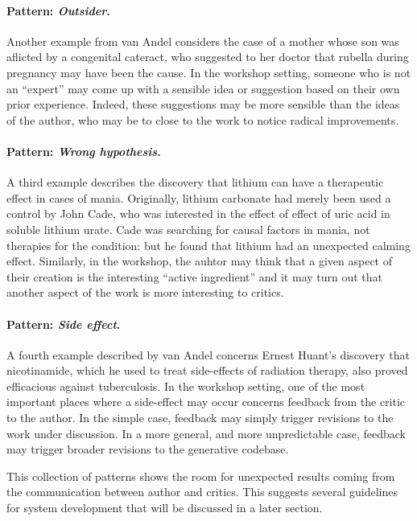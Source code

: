 \vspace{-3ex}
\paragraph{Pattern: \emph{Outsider}.}  Another example from van Andel considers
the case of a mother whose son was aflicted by a congenital cateract,
who suggested to her doctor that rubella during pregnancy may have
been the cause.  In the workshop setting, someone who is not an
``expert'' may come up with a sensible idea or suggestion based on
their own prior experience.  Indeed, these suggestions may be more
sensible than the ideas of the author, who may be to close to the work
to notice radical improvements.  

\vspace{-3ex}
\paragraph{Pattern: \emph{Wrong hypothesis}.}  A third example describes the discovery that lithium
can have a therapeutic effect in cases of mania.  Originally, lithium
carbonate had merely been used a control by John Cade, who was
interested in the effect of effect of uric acid in soluble lithium
urate.  Cade was searching for causal factors in mania, not therapies
for the condition: but he found that lithium had an unexpected calming
effect.  Similarly, in the workshop, the auhtor may think that a given
aspect of their creation is the interesting ``active ingredient'' and
it may turn out that another aspect of the work is more interesting to
critics.

\vspace{-3ex}
\paragraph{Pattern: \emph{Side effect}.}  A fourth example described by van Andel concerns
Ernest Huant's discovery that nicotinamide, which he used to treat
side-effects of radiation therapy, also proved efficacious against
tuberculosis.  In the workshop setting, one of the most important
places where a side-effect may occur concerns feedback from the critic
to the author.  In the simple case, feedback may simply trigger
revisions to the work under discussion.  In a more general, and more
unpredictable case, feedback may trigger broader revisions to the
generative codebase.  

\bigskip

This collection of patterns shows the room for unexpected results 
coming from the communication between author and critics.   This
suggests several guidelines for system development that will be discussed
in a later section.

